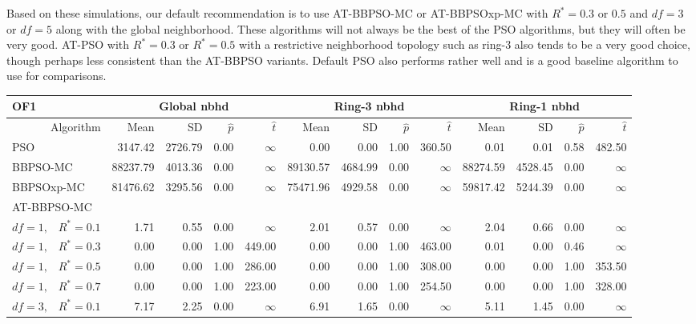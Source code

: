 \documentclass[12pt]{article}
\begin{document}
Based on these simulations, our default recommendation is to use AT-BBPSO-MC or AT-BBPSOxp-MC with $R^*=0.3$ or $0.5$ and $df=3$ or $df=5$ along with the global neighborhood. These algorithms will not always be the best of the PSO algorithms, but they will often be very good. AT-PSO with $R^*=0.3$ or $R^*=0.5$ with a restrictive neighborhood topology such as ring-3 also tends to be a very good choice, though perhaps less consistent than the AT-BBPSO variants. Default PSO also performs rather well and is a good baseline algorithm to use for comparisons.

\begin{table}[ht]
\centering
\tiny{
\begin{tabular}{r|rrrr|rrrr|rrrr}
\multicolumn{1}{l}{OF1} & \multicolumn{4}{c}{Global nbhd} & \multicolumn{4}{c}{Ring-3 nbhd} & \multicolumn{4}{c}{Ring-1 nbhd}\\
\hline
Algorithm & Mean & SD & $\widehat{p}$ & $\widehat{t}$ & Mean & SD & $\widehat{p}$ & $\widehat{t}$ & Mean & SD & $\widehat{p}$ & $\widehat{t}$ \\
  \hline
\multicolumn{1}{l|}{PSO} & 3147.42 & 2726.79 & 0.00 & $\infty$ & 0.00 & 0.00 & 1.00 & 360.50 & 0.01 & 0.01 & 0.58 & 482.50 \\ 
  \multicolumn{1}{l|}{BBPSO-MC} & 88237.79 & 4013.36 & 0.00 & $\infty$ & 89130.57 & 4684.99 & 0.00 & $\infty$ & 88274.59 & 4528.45 & 0.00 & $\infty$ \\ 
  \multicolumn{1}{l|}{BBPSOxp-MC} & 81476.62 & 3295.56 & 0.00 & $\infty$ & 75471.96 & 4929.58 & 0.00 & $\infty$ & 59817.42 & 5244.39 & 0.00 & $\infty$ \\ 
\hline
\multicolumn{1}{l|}{AT-BBPSO-MC} &&&&&&&&&&&&\\
  $df = 1,\enspace$ $R^* =0.1$ & 1.71 & 0.55 & 0.00 & $\infty$ & 2.01 & 0.57 & 0.00 & $\infty$ & 2.04 & 0.66 & 0.00 & $\infty$ \\ 
  $df = 1,\enspace$ $R^* =0.3$ & 0.00 & 0.00 & 1.00 & 449.00 & 0.00 & 0.00 & 1.00 & 463.00 & 0.01 & 0.00 & 0.46 & $\infty$ \\ 
  $df = 1,\enspace$ $R^* =0.5$ & 0.00 & 0.00 & 1.00 & 286.00 & 0.00 & 0.00 & 1.00 & 308.00 & 0.00 & 0.00 & 1.00 & 353.50 \\ 
  $df = 1,\enspace$ $R^* =0.7$ & 0.00 & 0.00 & 1.00 & 223.00 & 0.00 & 0.00 & 1.00 & 254.50 & 0.00 & 0.00 & 1.00 & 328.00 \\ 
  $df = 3,\enspace$ $R^* =0.1$ & 7.17 & 2.25 & 0.00 & $\infty$ & 6.91 & 1.65 & 0.00 & $\infty$ & 5.11 & 1.45 & 0.00 & $\infty$ \\ 

\end{tabular}}
\end{table}
\end{document}
